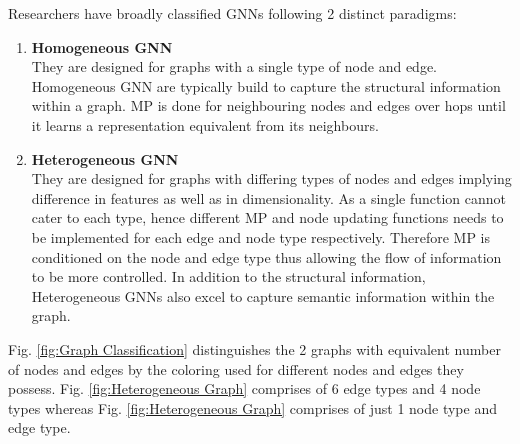 \documentclass{report} %
\begin{document}

Researchers have broadly classified \ac{GNN}s following 2 distinct paradigms:
\begin{enumerate}[nosep]
    \item \textbf{Homogeneous \ac{GNN}} \\
        They are designed for graphs with a single type of node and edge. 
        Homogeneous \ac{GNN} are typically build to capture the structural information within a graph.
        \ac{MP} is done for neighbouring nodes and edges over hops until it learns a representation equivalent from its neighbours.
    \item \textbf{Heterogeneous \ac{GNN}} \\    
        They are designed for graphs with differing types of nodes and edges implying difference in features as well as in dimensionality.
        As a single function cannot cater to each type, hence different \ac{MP} and node updating functions needs to be implemented for each edge and node type respectively.
        Therefore \ac{MP} is conditioned on the node and edge type thus allowing the flow of information to be more controlled. 
        In addition to the structural information, Heterogeneous \ac{GNN}s also excel to capture semantic information within the graph.\\
\end{enumerate}

Fig. \ref{fig:Graph Classification} distinguishes the 2 graphs with equivalent number of nodes and edges by the coloring used for different nodes and edges they possess. 
Fig. \ref{fig:Heterogeneous Graph} comprises of 6 edge types and 4 node types whereas Fig. \ref{fig:Heterogeneous Graph} comprises of just 1 node type and edge type.
\end{document}
